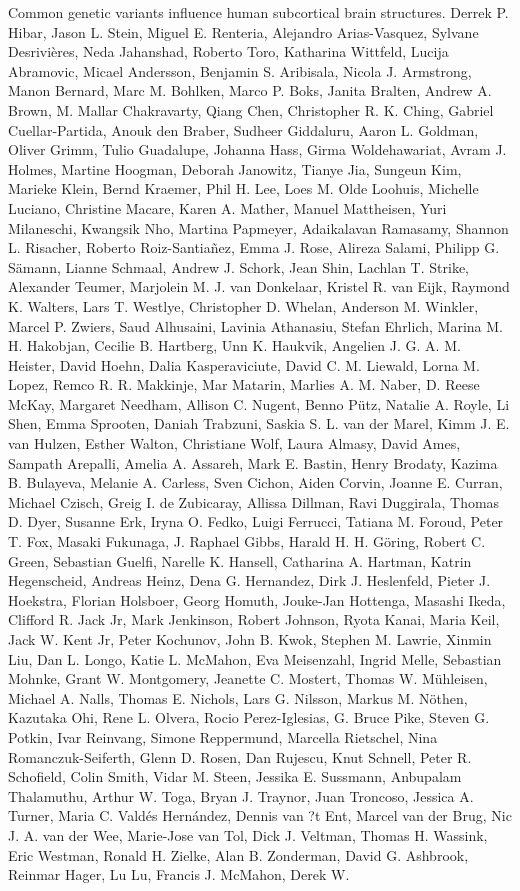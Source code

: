 \documentclass[twocolumn]{bmcart}%
\begin{document}
\begin{backmatter}
Common genetic variants influence human subcortical brain structures. Derrek P. Hibar, Jason L. Stein, Miguel E. Renteria, Alejandro Arias-Vasquez, Sylvane Desrivières, Neda Jahanshad, Roberto Toro, Katharina Wittfeld, Lucija Abramovic, Micael Andersson, Benjamin S. Aribisala, Nicola J. Armstrong, Manon Bernard, Marc M. Bohlken, Marco P. Boks, Janita Bralten, Andrew A. Brown, M. Mallar Chakravarty, Qiang Chen, Christopher R. K. Ching, Gabriel Cuellar-Partida, Anouk den Braber, Sudheer Giddaluru, Aaron L. Goldman, Oliver Grimm, Tulio Guadalupe, Johanna Hass, Girma Woldehawariat, Avram J. Holmes, Martine Hoogman, Deborah Janowitz, Tianye Jia, Sungeun Kim, Marieke Klein, Bernd Kraemer, Phil H. Lee, Loes M. Olde Loohuis, Michelle Luciano, Christine Macare, Karen A. Mather, Manuel Mattheisen, Yuri Milaneschi, Kwangsik Nho, Martina Papmeyer, Adaikalavan Ramasamy, Shannon L. Risacher, Roberto Roiz-Santiañez, Emma J. Rose, Alireza Salami, Philipp G. Sämann, Lianne Schmaal, Andrew J. Schork, Jean Shin, Lachlan T. Strike, Alexander Teumer, Marjolein M. J. van Donkelaar, Kristel R. van Eijk, Raymond K. Walters, Lars T. Westlye, Christopher D. Whelan, Anderson M. Winkler, Marcel P. Zwiers, Saud Alhusaini, Lavinia Athanasiu, Stefan Ehrlich, Marina M. H. Hakobjan, Cecilie B. Hartberg, Unn K. Haukvik, Angelien J. G. A. M. Heister, David Hoehn, Dalia Kasperaviciute, David C. M. Liewald, Lorna M. Lopez, Remco R. R. Makkinje, Mar Matarin, Marlies A. M. Naber, D. Reese McKay, Margaret Needham, Allison C. Nugent, Benno Pütz, Natalie A. Royle, Li Shen, Emma Sprooten, Daniah Trabzuni, Saskia S. L. van der Marel, Kimm J. E. van Hulzen, Esther Walton, Christiane Wolf, Laura Almasy, David Ames, Sampath Arepalli, Amelia A. Assareh, Mark E. Bastin, Henry Brodaty, Kazima B. Bulayeva, Melanie A. Carless, Sven Cichon, Aiden Corvin, Joanne E. Curran, Michael Czisch, Greig I. de Zubicaray, Allissa Dillman, Ravi Duggirala, Thomas D. Dyer, Susanne Erk, Iryna O. Fedko, Luigi Ferrucci, Tatiana M. Foroud, Peter T. Fox, Masaki Fukunaga, J. Raphael Gibbs, Harald H. H. Göring, Robert C. Green, Sebastian Guelfi, Narelle K. Hansell, Catharina A. Hartman, Katrin Hegenscheid, Andreas Heinz, Dena G. Hernandez, Dirk J. Heslenfeld, Pieter J. Hoekstra, Florian Holsboer, Georg Homuth, Jouke-Jan Hottenga, Masashi Ikeda, Clifford R. Jack Jr, Mark Jenkinson, Robert Johnson, Ryota Kanai, Maria Keil, Jack W. Kent Jr, Peter Kochunov, John B. Kwok, Stephen M. Lawrie, Xinmin Liu, Dan L. Longo, Katie L. McMahon, Eva Meisenzahl, Ingrid Melle, Sebastian Mohnke, Grant W. Montgomery, Jeanette C. Mostert, Thomas W. Mühleisen, Michael A. Nalls, Thomas E. Nichols, Lars G. Nilsson, Markus M. Nöthen, Kazutaka Ohi, Rene L. Olvera, Rocio Perez-Iglesias, G. Bruce Pike, Steven G. Potkin, Ivar Reinvang, Simone Reppermund, Marcella Rietschel, Nina Romanczuk-Seiferth, Glenn D. Rosen, Dan Rujescu, Knut Schnell, Peter R. Schofield, Colin Smith, Vidar M. Steen, Jessika E. Sussmann, Anbupalam Thalamuthu, Arthur W. Toga, Bryan J. Traynor, Juan Troncoso, Jessica A. Turner, Maria C. Valdés Hernández, Dennis van ?t Ent, Marcel van der Brug, Nic J. A. van der Wee, Marie-Jose van Tol, Dick J. Veltman, Thomas H. Wassink, Eric Westman, Ronald H. Zielke, Alan B. Zonderman, David G. Ashbrook, Reinmar Hager, Lu Lu, Francis J. McMahon, Derek W. 
\end{backmatter}
\end{document}
